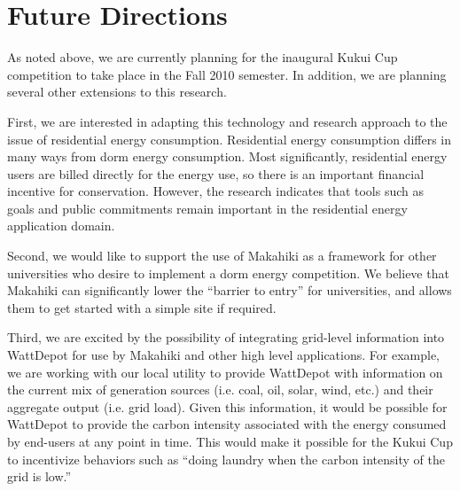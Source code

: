 
\section{Future Directions}
\label{sec:future-directions}

As noted above, we are currently planning for the inaugural Kukui Cup
competition to take place in the Fall 2010 semester.  In addition, we are planning
several other extensions to this research.

First, we are interested in adapting this technology and research approach
to the issue of residential energy consumption.  Residential energy
consumption differs in many ways from dorm energy consumption. Most
significantly, residential energy users are billed directly for the energy
use, so there is an important financial incentive for conservation.
However, the research indicates that tools such as goals and public
commitments remain important in the residential energy application domain.

Second, we would like to support the use of Makahiki as a framework for
other universities who desire to implement a dorm energy competition.  We
believe that Makahiki can significantly lower the ``barrier to entry'' for
universities, and allows them to get started with a simple site if required. 

Third, we are excited by the possibility of integrating grid-level
information into WattDepot for use by Makahiki and other high level
applications.  For example, we are working with our local utility to
provide WattDepot with information on the current mix of generation sources
(i.e. coal, oil, solar, wind, etc.) and their aggregate output
(i.e. grid load).  Given this information, it would be possible for
WattDepot to provide the carbon intensity associated with the energy
consumed by end-users at any point in time.  This would make it possible
for the Kukui Cup to incentivize behaviors such as ``doing laundry when the
carbon intensity of the grid is low.''





